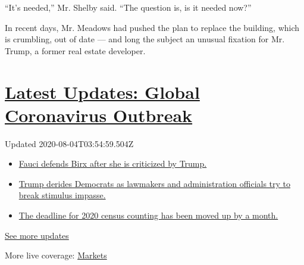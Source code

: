 ``It's needed,'' Mr. Shelby said. ``The question is, is it needed now?''

In recent days, Mr. Meadows had pushed the plan to replace the building,
which is crumbling, out of date --- and long the subject an unusual
fixation for Mr. Trump, a former real estate developer.

\hypertarget{latest-updates-global-coronavirus-outbreak}{%
\section{\texorpdfstring{\href{https://www.nytimes.com/2020/08/03/world/coronavirus-covid-19.html?action=click\&pgtype=Article\&state=default\&region=MAIN_CONTENT_1\&context=storylines_live_updates}{Latest
Updates: Global Coronavirus
Outbreak}}{Latest Updates: Global Coronavirus Outbreak}}\label{latest-updates-global-coronavirus-outbreak}}

Updated 2020-08-04T03:54:59.504Z

\begin{itemize}
\tightlist
\item
  \href{https://www.nytimes.com/2020/08/03/world/coronavirus-covid-19.html?action=click\&pgtype=Article\&state=default\&region=MAIN_CONTENT_1\&context=storylines_live_updates\#link-4547638f}{Fauci
  defends Birx after she is criticized by Trump.}
\item
  \href{https://www.nytimes.com/2020/08/03/world/coronavirus-covid-19.html?action=click\&pgtype=Article\&state=default\&region=MAIN_CONTENT_1\&context=storylines_live_updates\#link-15e7f995}{Trump
  derides Democrats as lawmakers and administration officials try to
  break stimulus impasse.}
\item
  \href{https://www.nytimes.com/2020/08/03/world/coronavirus-covid-19.html?action=click\&pgtype=Article\&state=default\&region=MAIN_CONTENT_1\&context=storylines_live_updates\#link-e5a2cda}{The
  deadline for 2020 census counting has been moved up by a month.}
\end{itemize}

\href{https://www.nytimes.com/2020/08/03/world/coronavirus-covid-19.html?action=click\&pgtype=Article\&state=default\&region=MAIN_CONTENT_1\&context=storylines_live_updates}{See
more updates}

More live coverage:
\href{https://www.nytimes.com/live/2020/08/03/business/stock-market-today-coronavirus?action=click\&pgtype=Article\&state=default\&region=MAIN_CONTENT_1\&context=storylines_live_updates}{Markets}

